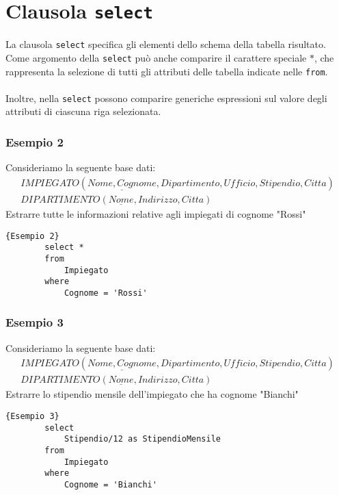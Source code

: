 \section{Clausola \texttt{select}}
La clausola \texttt{select} specifica gli elementi dello schema della tabella risultato.\\
Come argomento della \texttt{select} può anche comparire il carattere speciale $*$, che rappresenta la selezione di tutti gli attributi delle tabella indicate nelle \texttt{from}.\\\\
Inoltre, nella \texttt{select} possono comparire generiche espressioni sul valore degli attributi di ciascuna riga selezionata.

\subsubsection{Esempio 2}
Consideriamo la seguente base dati:
    \begin{equation}\begin{aligned}
        IMPIEGATO (\underline{Nome, Cognome}, Dipartimento, Ufficio, Stipendio, Citta)\\
        DIPARTIMENTO (\underline{Nome}, Indirizzo, Citta)
    \end{aligned}\end{equation}
Estrarre tutte le informazioni relative agli impiegati di cognome "Rossi"
    \begin{lstlisting}{Esempio 2}
        select *
        from 
            Impiegato
        where 
            Cognome = 'Rossi'
    \end{lstlisting}

\subsubsection{Esempio 3}
Consideriamo la seguente base dati:
    \begin{equation}\begin{aligned}
        IMPIEGATO (\underline{Nome, Cognome}, Dipartimento, Ufficio, Stipendio, Citta)\\
        DIPARTIMENTO (\underline{Nome}, Indirizzo, Citta)
    \end{aligned}\end{equation}
Estrarre lo stipendio mensile dell'impiegato che ha cognome "Bianchi"
    \begin{lstlisting}{Esempio 3}
        select 
            Stipendio/12 as StipendioMensile
        from 
            Impiegato
        where 
            Cognome = 'Bianchi'
    \end{lstlisting}



